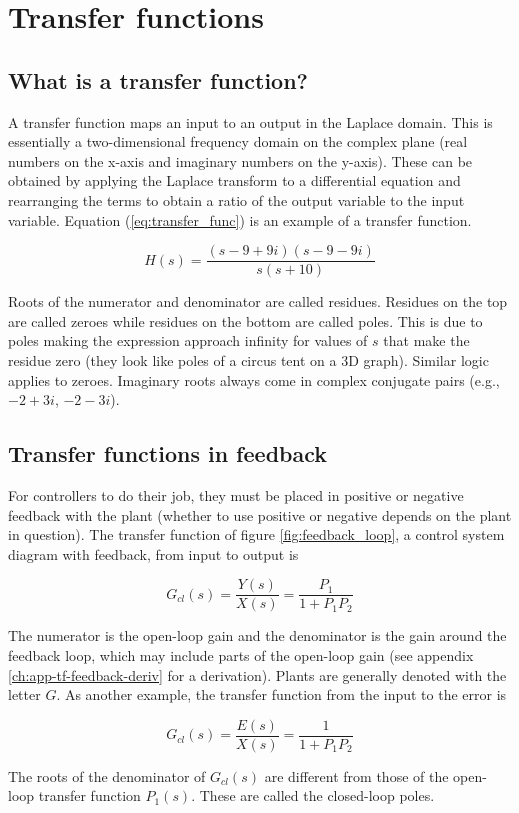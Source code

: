 \chapter{Transfer functions}

\section{What is a transfer function?}

A transfer function maps an input to an output in the Laplace domain. This is
essentially a two-dimensional frequency domain on the complex plane (real
numbers on the x-axis and imaginary numbers on the y-axis). These can be
obtained by applying the Laplace transform to a differential equation and
rearranging the terms to obtain a ratio of the output variable to the input
variable. Equation (\ref{eq:transfer_func}) is an example of a transfer
function.

\begin{equation} \label{eq:transfer_func}
  H(s) = \frac{(s-9+9i)(s-9-9i)}{s(s+10)}
\end{equation}

Roots of the numerator and denominator are called residues. Residues on the top
are called zeroes while residues on the bottom are called poles. This is due to
poles making the expression approach infinity for values of $s$ that make the
residue zero (they look like poles of a circus tent on a 3D graph). Similar
logic applies to zeroes. Imaginary roots always come in complex conjugate pairs
(e.g., $-2 + 3i$, $-2 - 3i$).

\section{Transfer functions in feedback}

For \glspl{controller} to do their job, they must be placed in positive or
negative feedback with the \gls{plant} (whether to use positive or negative
depends on the \gls{plant} in question). The transfer function of figure
\ref{fig:feedback_loop}, a control system diagram with feedback, from input to
output is

\begin{equation}
  G_{cl}(s) = \frac{Y(s)}{X(s)} = \frac{P_1}{1 + P_1 P_2}
\end{equation}

The numerator is the \gls{open-loop gain} and the denominator is the gain around
the feedback loop, which may include parts of the \gls{open-loop gain} (see
appendix \ref{ch:app-tf-feedback-deriv} for a derivation). Plants are generally
denoted with the letter $G$. As another example, the transfer function from the
input to the error is

\begin{equation}
  G_{cl}(s) = \frac{E(s)}{X(s)} = \frac{1}{1 + P_1 P_2}
\end{equation}

The roots of the denominator of $G_{cl}(s)$ are different from those of the
open-loop transfer function $P_1(s)$. These are called the closed-loop poles.
